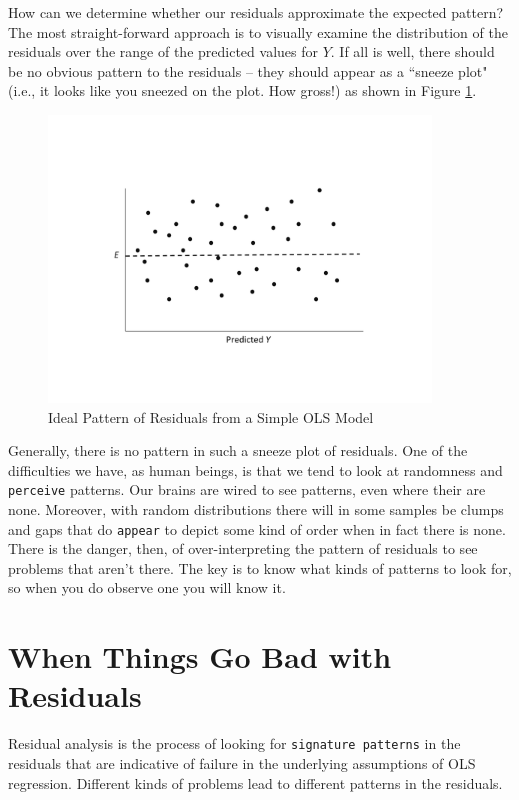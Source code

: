 \documentclass[11pt,openany]{book}\usepackage[]{graphicx}\usepackage[]{color}
\begin{document}
{How can we determine whether our residuals approximate the expected pattern? The most straight-forward approach is to visually examine the distribution of the residuals over the range of the predicted values for $Y$. If all is well, there should be no obvious pattern to the residuals -- they should appear as a ``sneeze plot" (i.e.,  it looks like you sneezed on the plot. How gross!) as shown in Figure \ref{fig:sneeze}.

\begin{figure}
  \centering
  \includegraphics[width=4in]{10_SimpleDiagnostics/sneeze.pdf}%
  \caption{Ideal Pattern of Residuals from a Simple OLS Model \label{fig:sneeze}}
\end{figure}

Generally, there is no pattern in such a sneeze plot of residuals. One of the difficulties we have, as human beings, is that we tend to look at randomness and \texttt{perceive} patterns. Our brains are wired to see patterns, even where their are none. Moreover, with random distributions there will in some samples be clumps and gaps that do \texttt{appear} to depict some kind of order when in fact there is none. There is the danger, then, of over-interpreting the pattern of residuals to see problems that aren't there. The key is to know what kinds of patterns to look for, so when you do observe one you will know it.

\section{When Things Go Bad with Residuals} 

Residual analysis is the process of looking for \texttt{signature patterns} in the residuals that are indicative of failure in the underlying assumptions of OLS regression. Different kinds of problems lead to different patterns in the residuals.

}
\end{document}
